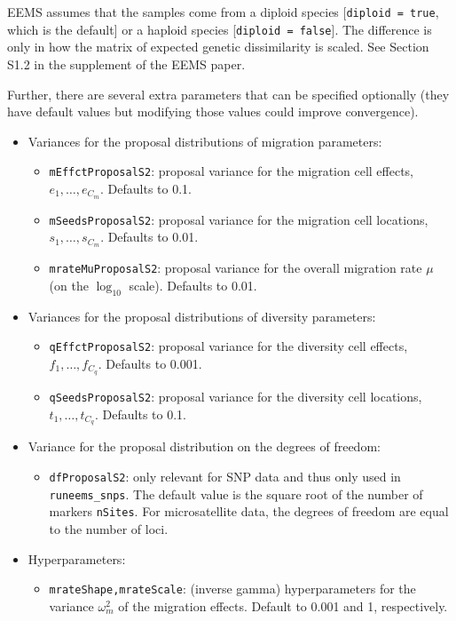\documentclass[a4paper,10pt,DIV=15,titlepage,mpinclude=true]{scrartcl}
\newcommand{\keystring}[1]{{\tt #1}}
\begin{document}
EEMS assumes that the samples come from a diploid species [\keystring{diploid = true}, which is the default] or a haploid species [\keystring{diploid = false}]. The difference is only in how the matrix of expected genetic dissimilarity is scaled. See Section S1.2 in the supplement of the EEMS paper.

Further, there are several extra parameters that can be specified optionally (they have default values but modifying those values could improve convergence).

\begin{itemize}
\item Variances for the proposal distributions of migration parameters:
\begin{itemize}
  \item \keystring{mEffctProposalS2}: proposal variance for the migration cell effects, $e_1,\ldots,e_{C_m}$. Defaults to 0.1.
  \item \keystring{mSeedsProposalS2}: proposal variance for the migration cell locations, $s_1,\ldots,s_{C_m}$. Defaults to 0.01.
  \item \keystring{mrateMuProposalS2}: proposal variance for the overall migration rate $\mu$ (on the $\log_{10}$ scale). Defaults to 0.01.
\end{itemize}
\item Variances for the proposal distributions of diversity parameters:
\begin{itemize}
  \item \keystring{qEffctProposalS2}: proposal variance for the diversity cell effects, $f_1,\ldots,f_{C_q}$. Defaults to 0.001.
  \item \keystring{qSeedsProposalS2}: proposal variance for the diversity cell locations, $t_1,\ldots,t_{C_q}$. Defaults to 0.1.
\end{itemize}
\item Variance for the proposal distribution on the degrees of freedom:
\begin{itemize}
  \item \keystring{dfProposalS2}: only relevant for SNP data and thus only used in \keystring{runeems\_snps}. The default value is the square root of the number of markers \keystring{nSites}. For microsatellite data, the degrees of freedom are equal to the number of loci.
\end{itemize}
\item Hyperparameters:
\begin{itemize}
  \item \keystring{mrateShape,mrateScale}: (inverse gamma) hyperparameters for the variance $\omega_m^2$ of the migration effects. Default to 0.001 and 1, respectively.

\end{itemize}
\end{itemize}
\end{document}
